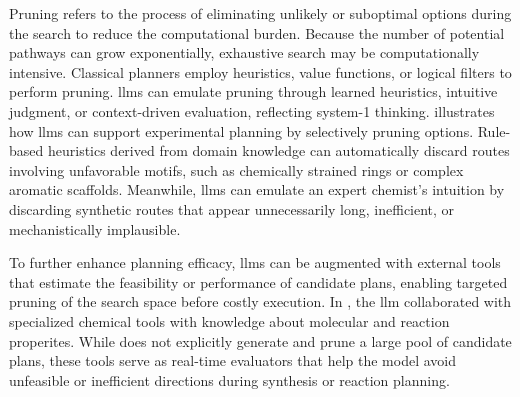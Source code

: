 Pruning refers to the process of eliminating unlikely or suboptimal options during the search to reduce the computational burden.
Because the number of potential pathways can grow exponentially, exhaustive search may be computationally intensive. 
Classical planners employ heuristics, value functions, or logical filters to perform pruning\autocite{bonet2012action}. 
\glspl{llm} can emulate pruning through learned heuristics, intuitive judgment, or context-driven evaluation, \autocite{gao2025synergizing} reflecting system-1 thinking.
 illustrates how \glspl{llm} can support experimental planning by selectively pruning options.
Rule-based heuristics derived from domain knowledge can automatically discard routes involving unfavorable motifs, such as chemically strained rings or complex aromatic scaffolds. 
Meanwhile, \glspl{llm} can emulate an expert chemist's intuition by discarding synthetic routes that appear unnecessarily long, inefficient, or mechanistically implausible. 

To further enhance planning efficacy, \glspl{llm} can be augmented with external tools that estimate the feasibility or performance of candidate plans, enabling targeted pruning of the search space before costly execution. 
In , the \gls{llm} collaborated with specialized chemical tools with knowledge about molecular and reaction properites. While  does not explicitly generate and prune a large pool of candidate plans, these tools serve as real-time evaluators that help the model avoid unfeasible or inefficient directions during synthesis or reaction planning.

